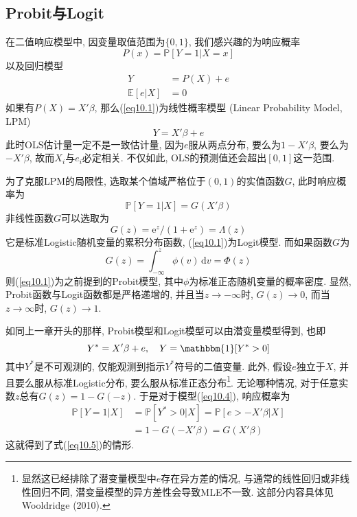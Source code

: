 \documentclass[cn, 12pt, math=mtpro2, bibstyle=apa, blue, twocol]{elegantbook}
\newcommand{\E}{\mathbb{E}}
\newcommand{\PP}{\mathbb{P}}
\begin{document}
\subsection{Probit与Logit}
在二值响应模型中, 因变量取值范围为$\{0,1\}$, 我们感兴趣的为响应概率
$$P(x)=\PP[Y=1|X=x]$$
以及回归模型
\begin{align}
Y&=P(X)+e \label{eq10.1} \\
\E[e|X]&=0 \nonumber
\end{align}
如果有$P(X)=X'\beta$, 那么(\ref{eq10.1})为线性概率模型 (Linear Probability Model, LPM)
$$Y=X'\beta+e$$
此时OLS估计量一定不是一致估计量, 因为$e$服从两点分布, 要么为$1-X'\beta$, 要么为$-X'\beta$, 故而$X_i$与$e_i$必定相关. 不仅如此, OLS的预测值还会超出$[0,1]$这一范围.

为了克服LPM的局限性, 选取某个值域严格位于$(0,1)$的实值函数$G$, 此时响应概率为
\begin{equation}\label{eq10.5}
  \PP[Y=1|X]=G(X'\beta)
\end{equation}
非线性函数$G$可以选取为
\begin{equation}\label{eq10.2}
  G(z)=\text{e}^z/(1+\text{e}^z)=\Lambda(z)
\end{equation}
它是标准Logistic随机变量的累积分布函数, (\ref{eq10.1})为Logit模型. 而如果函数$G$为
\begin{equation}\label{eq10.3}
  G(z)=\int_{-\infty}^{z}\phi(v)\,\text{d}v=\Phi(z)
\end{equation}
则(\ref{eq10.1})为之前提到的Probit模型, 其中$\phi$为标准正态随机变量的概率密度. 显然, Probit函数与Logit函数都是严格递增的, 并且当$z\to-\infty$时, $G(z)\to 0$, 而当$z\to\infty$时, $G(z)\to1$.

如同上一章开头的那样, Probit模型和Logit模型可以由潜变量模型得到, 也即
\begin{equation}\label{eq10.4}
  Y^\ast=X'\beta+e,\quad Y=\mathbbm{1}[Y^\ast>0]
\end{equation}
其中$Y^\ast$是不可观测的, 仅能观测到指示$Y^\ast$符号的二值变量. 此外, 假设$e$独立于$X$, 并且要么服从标准Logistic分布, 要么服从标准正态分布\footnote{显然这已经排除了潜变量模型中$e$存在异方差的情况, 与通常的线性回归或非线性回归不同, 潜变量模型的异方差性会导致MLE不一致. 这部分内容具体见 Wooldridge (2010).}. 无论哪种情况, 对于任意实数$z$总有$G(z)=1-G(-z)$. 于是对于模型(\ref{eq10.4}), 响应概率为
\begin{align*}
\PP[Y=1|X]&=\PP[Y^\ast>0|X]=\PP[e>-X'\beta|X] \\
&=1-G(-X'\beta)=G(X'\beta)
\end{align*}
这就得到了式(\ref{eq10.5})的情形.
\end{document}

